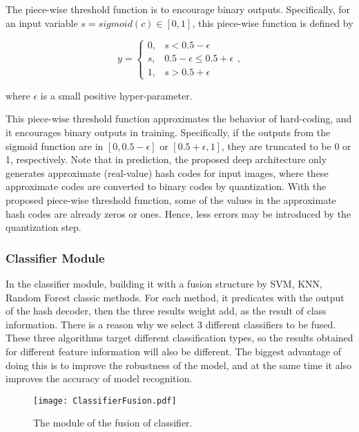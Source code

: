 The piece-wise threshold function is to 
encourage binary outputs. Specifically, for an 
input variable $s = sigmoid(c) \in [0,1]$, 
this piece-wise function is defined by

\begin{equation}
    \label{eq:eq_descr_3}
    y = \left\{
        \begin{array}{lr}
            0, & s < 0.5-\epsilon \\
            s, & 0.5-\epsilon \le 0.5+\epsilon \\
            1, & s > 0.5+\epsilon
        \end{array}
    \right.\nonumber,
\end{equation}

where $\epsilon$ is a small positive 
hyper-parameter.

This piece-wise threshold function 
approximates the behavior of hard-coding, 
and it encourages binary outputs in training. 
Specifically, if the outputs from the sigmoid 
function are in $[0, 0.5-\epsilon]$ or 
$[0.5+\epsilon, 1]$, they are truncated to be 
0 or 1, respectively. Note that in prediction, 
the proposed deep architecture only generates 
approximate (real-value) hash codes for input 
images, where these approximate codes are 
converted to binary codes by quantization. 
With the proposed piece-wise threshold 
function, some of the values in the 
approximate hash codes are already zeros or 
ones. Hence, less errors may be introduced
by the quantization step.

\subsubsection{Classifier Module}
\label{sec:MethNetCls}

In the classifier module, building it with
a fusion structure by SVM, KNN, Random
Forest classic methods. For each method, it 
predicates with the output of the hash decoder,
then the three results weight add, as the 
result of class information. There is a reason
why we select 3 different classifiers to be 
fused. These three algorithms target 
different classification types, so the 
results obtained for different feature 
information will also be different. The 
biggest advantage of doing this is to 
improve the robustness of the model, 
and at the same time it also improves 
the accuracy of model recognition. 

\begin{figure*}[!ht]
    \centering
    \texttt{[image: ClassifierFusion.pdf]}
    \caption{The module of the fusion of 
        classifier.}
    \label{fig:classifierFusion}
\end{figure*}   

